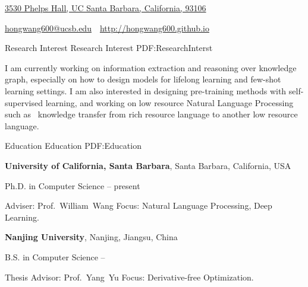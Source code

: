 \documentclass[letterpaper,MMMyyyy,nonstopmode]{simpleresumecv}
\newcommand{\CVAuthor}{Hong Wang}
\newcommand{\CVWebpage}{http://hongwang600.github.io}
\begin{document}

\Title{\CVAuthor}

\begin{SubTitle}
\href{https://www.google.com/maps/place/Phelps+Hall/@34.4161308,-119.8468366,17z/data=!3m1!4b1!4m5!3m4!1s0x80e93f7042b51aa9:0xc80cbd08cacd9e49!8m2!3d34.4161308!4d-119.8446426}
{3530 Phelps Hall, UC Santa Barbara, California, 93106}
\par
\href{mailto:hongwang600@ucsb.edu}
{hongwang600@ucsb.edu}
\,\SubBulletSymbol\,
\href{\CVWebpage}
{\url{\CVWebpage}}
\end{SubTitle}

\begin{Body}


\Section
{Research \newline Interest}
{Research Interest}
{PDF:ResearchInterst}

\Entry
I am currently working on information extraction and reasoning over knowledge graph, especially on how to design models for lifelong learning and few-shot learning settings. I am also interested in designing pre-training methods with self-supervised learning, and working on low resource Natural Language Processing such as  knowledge transfer from rich resource language to another low resource language. 


\Section
{Education}
{Education}
{PDF:Education}

\Entry
\textbf{University of California, Santa Barbara},
Santa Barbara, California, USA

\Gap
\BulletItem
Ph.D. in Computer Science
\hfill
{} -- present
\begin{Detail}
\SubBulletItem
Adviser:
Prof.~William~Wang
\SubBulletItem
Focus:
Natural Language Processing, Deep Learning.
\end{Detail}

\BigGap
\Entry
\textbf{Nanjing University},
Nanjing, Jiangsu, China

\Gap
\BulletItem
B.S. in Computer Science
\hfill
{} --
\begin{Detail}
\SubBulletItem
Thesis Advisor: Prof.~Yang~Yu
\SubBulletItem
Focus: Derivative-free Optimization.
\end{Detail}


\end{Body}
\end{document}
